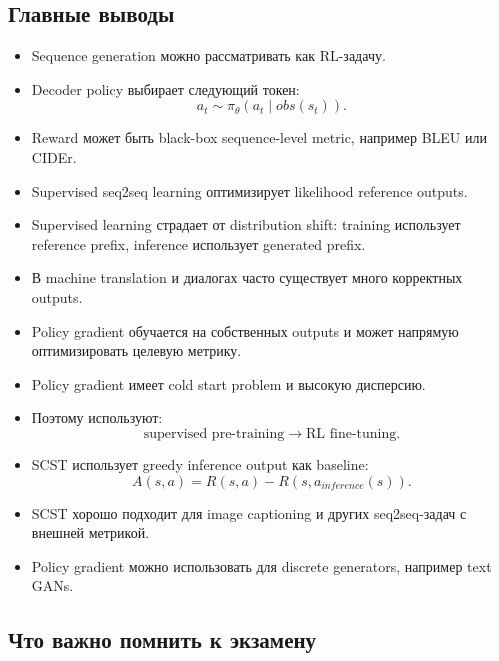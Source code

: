 \documentclass[a4paper,12pt]{article}
\begin{document}
\subsection{Главные выводы}

\begin{itemize}
    \item Sequence generation можно рассматривать как RL-задачу.
    \item Decoder policy выбирает следующий токен:
    \[
    a_t \sim \pi_\theta(a_t\mid obs(s_t)).
    \]

    \item Reward может быть black-box sequence-level metric, например BLEU или CIDEr.
    \item Supervised seq2seq learning оптимизирует likelihood reference outputs.
    \item Supervised learning страдает от distribution shift: training использует reference prefix, inference использует generated prefix.
    \item В machine translation и диалогах часто существует много корректных outputs.
    \item Policy gradient обучается на собственных outputs и может напрямую оптимизировать целевую метрику.
    \item Policy gradient имеет cold start problem и высокую дисперсию.
    \item Поэтому используют:
    \[
    \text{supervised pre-training}
    \rightarrow
    \text{RL fine-tuning}.
    \]

    \item SCST использует greedy inference output как baseline:
    \[
    A(s,a)
    =
    R(s,a)-R(s,a_{inference}(s)).
    \]

    \item SCST хорошо подходит для image captioning и других seq2seq-задач с внешней метрикой.
    \item Policy gradient можно использовать для discrete generators, например text GANs.
\end{itemize}

\subsection{Что важно помнить к экзамену}
\end{document}
